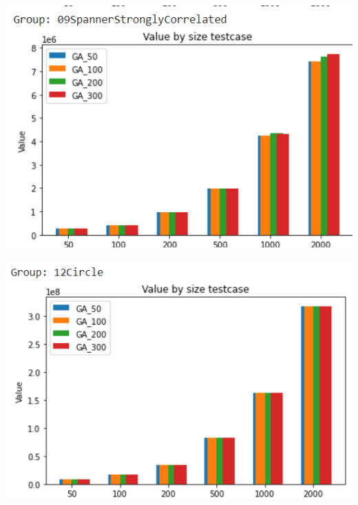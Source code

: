 \documentclass{article}
\begin{document}
\begin{enumerate}
\begin{center}
\end{center}
\begin{center}
    \centering
    \includegraphics[width=15cm]{image/AI3.png}
\end{center}
\begin{center}
    \centering
    \includegraphics[width=15cm]{image/AI4.png}
\end{center}

\end{enumerate}\rar
\end{document}
